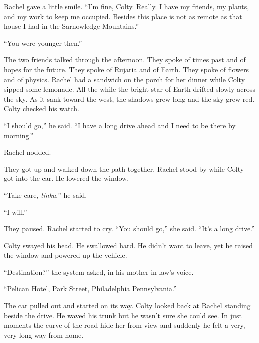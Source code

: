 Rachel gave a little smile. ``I'm fine, Colty. Really. I have my friends, my plants, and my work
to keep me occupied. Besides this place is not as remote as that house I had in the Sarnowledge
Mountains.''

``You were younger then.''

The two friends talked through the afternoon. They spoke of times past and of hopes for the
future. They spoke of Rujaria and of Earth. They spoke of flowers and of physics. Rachel had a
sandwich on the porch for her dinner while Colty sipped some lemonade. All the while the bright
star of Earth drifted slowly across the sky. As it sank toward the west, the shadows grew long
and the sky grew red. Colty checked his watch.

``I should go,'' he said. ``I have a long drive ahead and I need to be there by morning.''

Rachel nodded.

They got up and walked down the path together. Rachel stood by while Colty got into the car. He
lowered the window.

``Take care, \textit{tinka},'' he said.

``I will.''

They paused. Rachel started to cry. ``You should go,'' she said. ``It's a long drive.''

Colty swayed his head. He swallowed hard. He didn't want to leave, yet he raised the window and
powered up the vehicle.

``Destination?'' the system asked, in his mother-in-law's voice.

``Pelican Hotel, Park Street, Philadelphia Pennsylvania.''

The car pulled out and started on its way. Colty looked back at Rachel standing beside the
drive. He waved his trunk but he wasn't sure she could see. In just moments the curve of the
road hide her from view and suddenly he felt a very, very long way from home.

